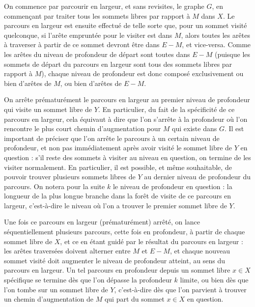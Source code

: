  On commence par parcourir en largeur, et sans revisites, le graphe $G$, en commençant par traiter tous les sommets libres par rapport à $M$ dans $X$. Le parcours en largeur est ensuite effectué de telle sorte que, pour un sommet visité quelconque, si l'arête empruntée pour le visiter est dans $M$, alors toutes les arêtes à traverser à partir de ce sommet devront être dans $E\minus M$, et vice-versa. Comme les arêtes du niveau de profondeur de départ sont toutes dans $E\minus M$ (puisque les sommets de départ du parcours en largeur sont tous des sommets libres par rapport à $M$), chaque niveau de profondeur est donc composé exclusivement ou bien d'arêtes de $M$, ou bien d'arêtes de $E\minus M$. 
 
 On arrête prématurément le parcours en largeur au premier niveau de profondeur qui visite un sommet libre de $Y$. En particulier, du fait de la spécificité de ce parcours en largeur, cela équivaut à dire que l'on s'arrête à la profondeur où l'on rencontre le plus court chemin d'augmentation pour $M$ qui existe dans $G$. Il est important de préciser que l'on arrête le parcours à un certain niveau de profondeur, et non pas immédiatement après avoir visité le sommet libre de $Y$ en question : s'il reste des sommets à visiter au niveau en question, on termine de les visiter normalement. En particulier, il est possible, et même souhaitable, de pouvoir trouver plusieurs sommets libres de $Y$ au dernier niveau de profondeur du parcours. On notera pour la suite $k$ le niveau de profondeur en question : la longueur de la plus longue branche dans la forêt de visite de ce parcours en largeur, c'est-à-dire le niveau où l'on a trouver le premier sommet libre de $Y$.
 
 Une fois ce parcours en largeur (prématurément) arrêté, on lance séquentiellement plusieurs parcours, cette fois en profondeur, à partir de chaque sommet libre de $X$, et ce en étant guidé par le résultat du parcours en largeur : les arêtes traversées doivent alterner entre $M$ et $E \minus M$, et chaque nouveau sommet visité doit augmenter le niveau de profondeur atteint, au sens du parcours en largeur. Un tel parcours en profondeur depuis un sommet libre $x \in X$ spécifique se termine dès que l'on dépasse la profondeur $k$ limite, ou bien dès que l'on tombe sur un sommet libre de $Y$, c'est-à-dire dès que l'on parvient à trouver un chemin d'augmentation de $M$ qui part du sommet $x \in X$ en question.
 

